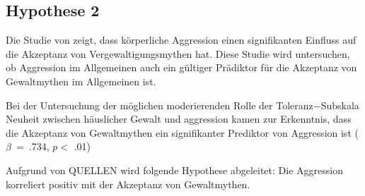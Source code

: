 \subsection{Hypothese 2}    \label{subsec_2.2.2}
Die Studie von \textcite{H2_u_3_Bhogal_2016} zeigt, dass körperliche Aggression einen signifikanten Einfluss auf die Akzeptanz von Vergewaltigungsmythen hat. Diese Studie wird untersuchen, ob Aggression im Allgemeinen auch ein gültiger Prädiktor für die Akzeptanz von Gewaltmythen im Allgemeinen ist.

Bei der Untersuchung der möglichen moderierenden Rolle der Toleranz$-$Subskala Neuheit zwischen häuslicher Gewalt und aggression kamen \textcite{H1_moderation_2020} zur Erkenntnis, dass die Akzeptanz von Gewaltmythen ein signifikanter Prediktor von Aggression ist ($\beta$~=~.734, $p<$ .01)

Aufgrund von QUELLEN wird folgende Hypothese abgeleitet: Die Aggression korreliert positiv mit der Akzeptanz von Gewaltmythen.


